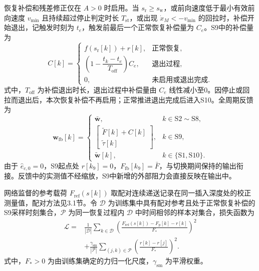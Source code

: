 \documentclass{JQR_LaTeX_Template-0507/JQRnewSubmission}
\begin{document}
恢复补偿和残差修正仅在 $A>0$ 时启用。当 $s_{\mathrm r}\ge s_{\mathrm w}$，或前向速度低于最小有效前向速度 $v_{\min}$ 且持续超过停止判定时长 $T_{\mathrm{st}}$，或出现 $\dot x_M<-v_{\min}$ 的回拉时，补偿开始退出，记触发时刻为 $t_e$，触发前最后一个正常恢复补偿量为 $C_e$。S9中的补偿量为
\begin{equation}
	\label{eq:withdrawal}
	C[k]=\begin{cases}
		f(s_{\mathrm r}[k])+r[k],&\text{正常恢复},\\
		\left(1-\dfrac{t_k-t_e}{T_{\mathrm{off}}}\right)C_e,&\text{退出过程},\\
		0,&\text{未启用或退出完成}.
	\end{cases}
\end{equation}
式中，$T_{\mathrm{off}}$ 为补偿退出时长，退出过程中补偿量由 $C_e$ 线性减小至0。因停止或回拉而退出后，本次恢复补偿不再启用；正常推进退出完成后进入S10。全周期反馈为
\begin{equation}
	\label{eq:phase-output}
	\bm w_{\mathrm{fb}}[k]=
	\begin{cases}
		\bar{\bm w},&k\in\mathrm{S2}\sim\mathrm{S8},\\
		\begin{bmatrix}\tilde F[k]+C[k]\\
			\tilde\tau[k]\end{bmatrix},&k\in\mathrm{S9},\\
		\tilde{\bm w}[k],&k\in\{\mathrm{S1},\mathrm{S10}\}.
	\end{cases}
\end{equation}
由于 $\hat e_{c,0}=0$，S9起点处 $r[k_9]=0$，$F_{\mathrm{fb}}[k_9]=\bar F$，与切换期间保持的输出衔接。反馈中的实测值不经缩放，S9中新增的外部阻力会直接反映在输出中。

网络监督的参考载荷 $F_{\mathrm{ref}}(s[k])$ 取配对连续递送记录在同一插入深度处的校正测量值，配对方法见3.1节。令 $\mathcal D$ 为训练集中具有配对参考且处于正常恢复补偿的S9采样时刻集合，$\mathcal P$ 为同一恢复过程内 $\mathcal D$ 中时间相邻的样本对集合，损失函数为
\begin{equation}
	\label{eq:gru-loss}
	\begin{aligned}
		\mathcal L={}&\frac{1}{|\mathcal D|}\sum_{k\in\mathcal D}
		\left(\frac{F_{\mathrm{ref}}(s[k])-F_{\mathrm p}[k]-r[k]}{F_*}\right)^2\\
		&+\frac{\gamma_{\mathrm{sm}}}{|\mathcal P|}
		\sum_{(j,k)\in\mathcal P}
		\left(\frac{r[k]-r[j]}{F_*}\right)^2.
	\end{aligned}
\end{equation}
式中，$F_*>0$ 为由训练集确定的力归一化尺度，$\gamma_{\mathrm{sm}}$ 为平滑权重。
\end{document}
